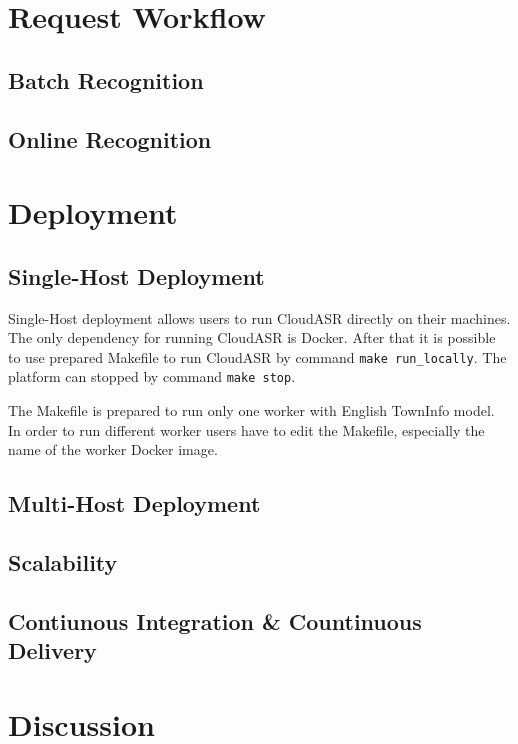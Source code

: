 


\section{Request Workflow}
\blindtext

\subsection{Batch Recognition}
\blindtext


\subsection{Online Recognition}
\blindtext




\section{Deployment}
\blindtext

\subsection{Single-Host Deployment}
Single-Host deployment allows users to run CloudASR directly on their machines.
The only dependency for running CloudASR is Docker.
After that it is possible to use prepared Makefile to run CloudASR by command \texttt{make run\_locally}.
The platform can stopped by command \texttt{make stop}.

The Makefile is prepared to run only one worker with English TownInfo model.
In order to run different worker users have to edit the Makefile, especially the name of the worker Docker image.


\subsection{Multi-Host Deployment}
\blindtext
{}

\subsection{Scalability}
\blindtext

\subsection{Contiunous Integration \& Countinuous Delivery}
\blindtext


\section{Discussion}
